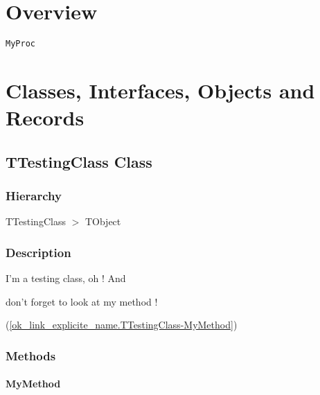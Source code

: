 \documentclass{report}
\newif\ifpdf
\begin{document}
\section{Overview}
\begin{description}
\item[\texttt{\begin{ttfamily}TTestingClass\end{ttfamily} Class}]
\end{description}
\begin{description}
\item[\texttt{MyProc}]
\end{description}
\section{Classes, Interfaces, Objects and Records}
\ifpdf
\subsection*{\large{\textbf{TTestingClass Class}}\normalsize\hspace{1ex}\hrulefill}
\else
\subsection*{TTestingClass Class}
\fi
\label{ok_link_explicite_name.TTestingClass}
\subsubsection*{\large{\textbf{Hierarchy}}\normalsize\hspace{1ex}\hfill}
TTestingClass {$>$} TObject
\subsubsection*{\large{\textbf{Description}}\normalsize\hspace{1ex}\hfill}
I'm a testing class, oh ! And \begin{ttfamily}don't forget to look at my method !\end{ttfamily}(\ref{ok_link_explicite_name.TTestingClass-MyMethod})\subsubsection*{\large{\textbf{Methods}}\normalsize\hspace{1ex}\hfill}
\paragraph*{MyMethod}\hspace*{\fill}
\end{document}
